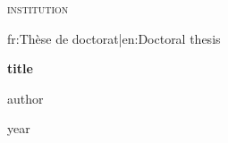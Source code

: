 \begin{titlepage}
  \centering
  {\large\scshape {{institution}}\par}
  \vspace{2cm}
  {\large {{fr:Thèse de doctorat|en:Doctoral thesis}}\par}
  \vspace{1.5cm}
  {\Huge\bfseries {{title}}\par}
  \vspace{2cm}
  {\Large {{author}}\par}
  \vfill
  {\large {{year}}\par}
\end{titlepage}
\cleardoublepage
